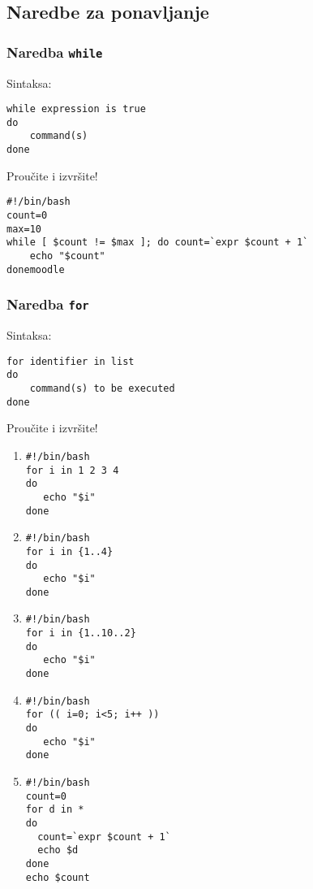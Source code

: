 \subsection*{Naredbe za ponavljanje}

 \subsubsection*{Naredba \texttt{while}}
Sintaksa:
\begin{lstlisting}
while expression is true
do
    command(s)
done
\end{lstlisting}

\begin{primjer} Proučite i izvršite!
\begin{lstlisting}
#!/bin/bash
count=0
max=10
while [ $count != $max ]; do count=`expr $count + 1`
    echo "$count"
donemoodle
\end{lstlisting}
\end{primjer}

\subsubsection*{Naredba \texttt{for}}
Sintaksa:
\begin{lstlisting}
for identifier in list
do
    command(s) to be executed
done
\end{lstlisting}

\begin{primjer} Proučite i izvršite!
\begin{enumerate}
 \item
\begin{lstlisting}
#!/bin/bash
for i in 1 2 3 4 
do
   echo "$i"
done 
\end{lstlisting}

\item 
\begin{lstlisting}
#!/bin/bash
for i in {1..4}
do
   echo "$i"
done 
\end{lstlisting}

\item 
\begin{lstlisting}
#!/bin/bash
for i in {1..10..2}
do
   echo "$i"
done 
\end{lstlisting}

\item 
\begin{lstlisting}
#!/bin/bash
for (( i=0; i<5; i++ ))
do
   echo "$i"
done 
\end{lstlisting}

\item 
\begin{lstlisting}
#!/bin/bash
count=0
for d in *
do
  count=`expr $count + 1`
  echo $d
done
echo $count
\end{lstlisting}
\end{enumerate}
\end{primjer}


